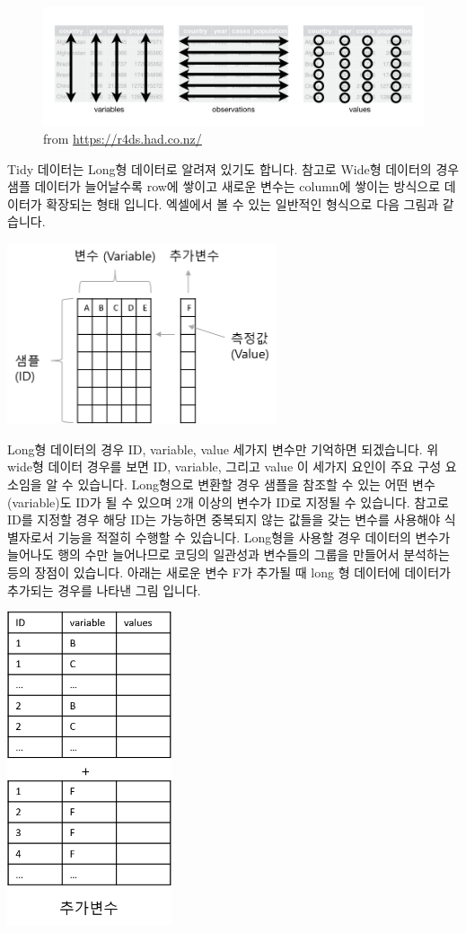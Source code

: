 \documentclass[
]{book}
\begin{document}
\begin{figure}
\centering
\includegraphics[width=4.6875in,height=\textheight]{images/07/tidy-1.png}
\caption{from \url{https://r4ds.had.co.nz/}}
\end{figure}

Tidy 데이터는 Long형 데이터로 알려져 있기도 합니다. 참고로 Wide형 데이터의 경우 샘플 데이터가 늘어날수록 row에 쌓이고 새로운 변수는 column에 쌓이는 방식으로 데이터가 확장되는 형태 입니다. 엑셀에서 볼 수 있는 일반적인 형식으로 다음 그림과 같습니다.

\includegraphics[width=3.125in,height=\textheight]{images/07/05.png}

Long형 데이터의 경우 ID, variable, value 세가지 변수만 기억하면 되겠습니다. 위 wide형 데이터 경우를 보면 ID, variable, 그리고 value 이 세가지 요인이 주요 구성 요소임을 알 수 있습니다. Long형으로 변환할 경우 샘플을 참조할 수 있는 어떤 변수 (variable)도 ID가 될 수 있으며 2개 이상의 변수가 ID로 지정될 수 있습니다. 참고로 ID를 지정할 경우 해당 ID는 가능하면 중복되지 않는 값들을 갖는 변수를 사용해야 식별자로서 기능을 적절히 수행할 수 있습니다. Long형을 사용할 경우 데이터의 변수가 늘어나도 행의 수만 늘어나므로 코딩의 일관성과 변수들의 그룹을 만들어서 분석하는 등의 장점이 있습니다. 아래는 새로운 변수 F가 추가될 때 long 형 데이터에 데이터가 추가되는 경우를 나타낸 그림 입니다.

\includegraphics[width=\textwidth,height=3.64583in]{images/07/06.png}
\end{document}
